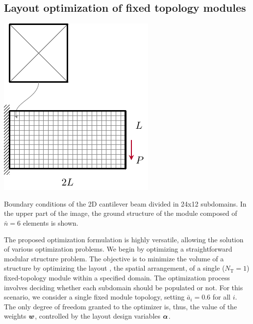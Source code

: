 \subsection{Layout optimization of fixed topology modules}
\begin{marginfigure}
    \centering
    \includegraphics[width=\linewidth]{figures/06_DMO/00_cantilever_bcs/cant_mesh.pdf}
    \caption{Boundary conditions of the 2D cantilever beam divided in 24x12 subdomains. In the upper part of the image, the ground structure of the module composed of $\bar{n}=6$ elements is shown.}
    \label{fig:06_cant_BC_GS}
\end{marginfigure}
The proposed optimization formulation is highly versatile, allowing the solution of various optimization problems. We begin by optimizing a straightforward modular structure problem. The objective is to minimize the volume of a structure by optimizing the layout \ie, the spatial arrangement, of a single ($N_\text{T}=1$) fixed-topology module within a specified domain. The optimization process involves deciding whether each subdomain should be populated or not. For this scenario, we consider a single fixed module topology, setting $\bar{a}_i=0.6$ for all $i$. The only degree of freedom granted to the optimizer is, thus, the value of the weights $\bm{w}$, controlled by the layout design variables $\bm{\alpha}$.

